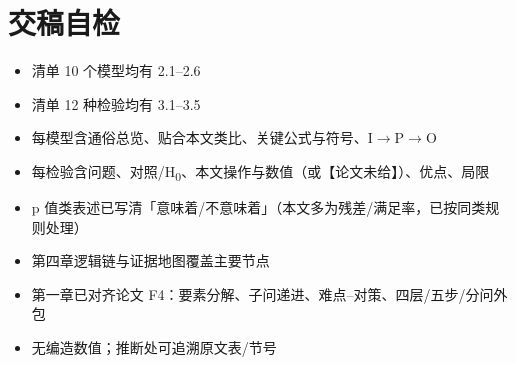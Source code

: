 \documentclass[UTF8,a4paper,zihao=-4]{ctexart}
\begin{document}
\section{\texorpdfstring{交稿自检}{交稿自检}}

\begin{itemize}[leftmargin=1.5em]
\item[\checkmark] 清单 10 个模型均有 2.1--2.6
\item[\checkmark] 清单 12 种检验均有 3.1--3.5
\item[\checkmark] 每模型含通俗总览、贴合本文类比、关键公式与符号、I$\rightarrow$P$\rightarrow$O
\item[\checkmark] 每检验含问题、对照/H\textsubscript{0}、本文操作与数值（或【论文未给】）、优点、局限
\item[\checkmark] p 值类表述已写清「意味着/不意味着」（本文多为残差/满足率，已按同类规则处理）
\item[\checkmark] 第四章逻辑链与证据地图覆盖主要节点
\item[\checkmark] 第一章已对齐论文 F4：要素分解、子问递进、难点--对策、四层/五步/分问外包
\item[\checkmark] 无编造数值；推断处可追溯原文表/节号
\end{itemize}
\end{document}
